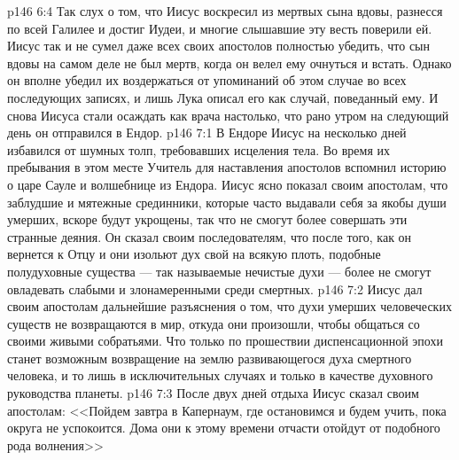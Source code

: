 \vs p146 6:4 Так слух о том, что Иисус воскресил из мертвых сына вдовы, разнесся по всей Галилее и достиг Иудеи, и многие слышавшие эту весть поверили ей. Иисус так и не сумел даже всех своих апостолов полностью убедить, что сын вдовы на самом деле не был мертв, когда он велел ему очнуться и встать. Однако он вполне убедил их воздержаться от упоминаний об этом случае во всех последующих записях, и лишь Лука описал его как случай, поведанный ему. И снова Иисуса стали осаждать как врача настолько, что рано утром на следующий день он отправился в Ендор.
\vs p146 7:1 В Ендоре Иисус на несколько дней избавился от шумных толп, требовавших исцеления тела. Во время их пребывания в этом месте Учитель для наставления апостолов вспомнил историю о царе Сауле и волшебнице из Ендора. Иисус ясно показал своим апостолам, что заблудшие и мятежные срединники, которые часто выдавали себя за якобы души умерших, вскоре будут укрощены, так что не смогут более совершать эти странные деяния. Он сказал своим последователям, что после того, как он вернется к Отцу и они изольют дух свой на всякую плоть, подобные полудуховные существа --- так называемые нечистые духи --- более не смогут овладевать слабыми и злонамеренными среди смертных.
\vs p146 7:2 Иисус дал своим апостолам дальнейшие разъяснения о том, что духи умерших человеческих существ не возвращаются в мир, откуда они произошли, чтобы общаться со своими живыми собратьями. Что только по прошествии диспенсационной эпохи станет возможным возвращение на землю развивающегося духа смертного человека, и то лишь в исключительных случаях и только в качестве духовного руководства планеты.
\vs p146 7:3 После двух дней отдыха Иисус сказал своим апостолам: <<Пойдем завтра в Капернаум, где остановимся и будем учить, пока округа не успокоится. Дома они к этому времени отчасти отойдут от подобного рода волнения>>
